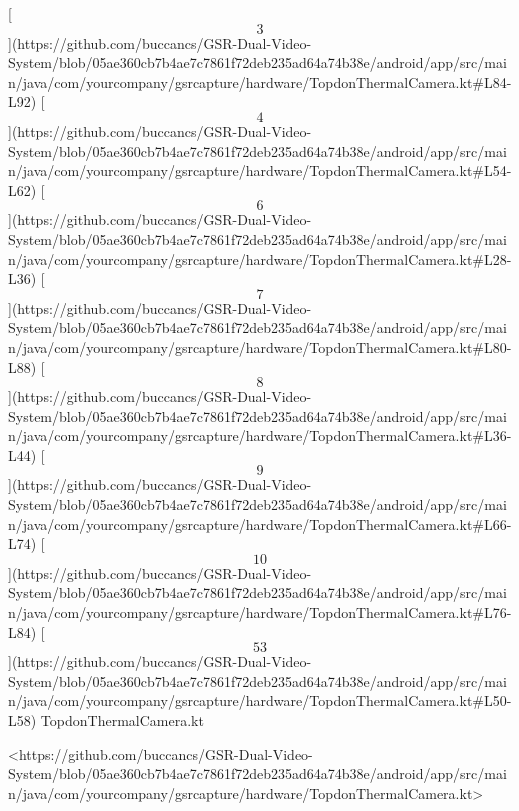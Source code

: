 \documentclass[12pt,a4paper]{article}
\begin{document}
{[\[3\]](https://github.com/buccancs/GSR-Dual-Video-System/blob/05ae360cb7b4ae7c7861f72deb235ad64a74b38e/android/app/src/main/java/com/yourcompany/gsrcapture/hardware/TopdonThermalCamera.kt#L84-L92)
[\[4\]](https://github.com/buccancs/GSR-Dual-Video-System/blob/05ae360cb7b4ae7c7861f72deb235ad64a74b38e/android/app/src/main/java/com/yourcompany/gsrcapture/hardware/TopdonThermalCamera.kt#L54-L62)
[\[6\]](https://github.com/buccancs/GSR-Dual-Video-System/blob/05ae360cb7b4ae7c7861f72deb235ad64a74b38e/android/app/src/main/java/com/yourcompany/gsrcapture/hardware/TopdonThermalCamera.kt#L28-L36)
[\[7\]](https://github.com/buccancs/GSR-Dual-Video-System/blob/05ae360cb7b4ae7c7861f72deb235ad64a74b38e/android/app/src/main/java/com/yourcompany/gsrcapture/hardware/TopdonThermalCamera.kt#L80-L88)
[\[8\]](https://github.com/buccancs/GSR-Dual-Video-System/blob/05ae360cb7b4ae7c7861f72deb235ad64a74b38e/android/app/src/main/java/com/yourcompany/gsrcapture/hardware/TopdonThermalCamera.kt#L36-L44)
[\[9\]](https://github.com/buccancs/GSR-Dual-Video-System/blob/05ae360cb7b4ae7c7861f72deb235ad64a74b38e/android/app/src/main/java/com/yourcompany/gsrcapture/hardware/TopdonThermalCamera.kt#L66-L74)
[\[10\]](https://github.com/buccancs/GSR-Dual-Video-System/blob/05ae360cb7b4ae7c7861f72deb235ad64a74b38e/android/app/src/main/java/com/yourcompany/gsrcapture/hardware/TopdonThermalCamera.kt#L76-L84)
[\[53\]](https://github.com/buccancs/GSR-Dual-Video-System/blob/05ae360cb7b4ae7c7861f72deb235ad64a74b38e/android/app/src/main/java/com/yourcompany/gsrcapture/hardware/TopdonThermalCamera.kt#L50-L58)
TopdonThermalCamera.kt

<https://github.com/buccancs/GSR-Dual-Video-System/blob/05ae360cb7b4ae7c7861f72deb235ad64a74b38e/android/app/src/main/java/com/yourcompany/gsrcapture/hardware/TopdonThermalCamera.kt>

}
\end{document}
